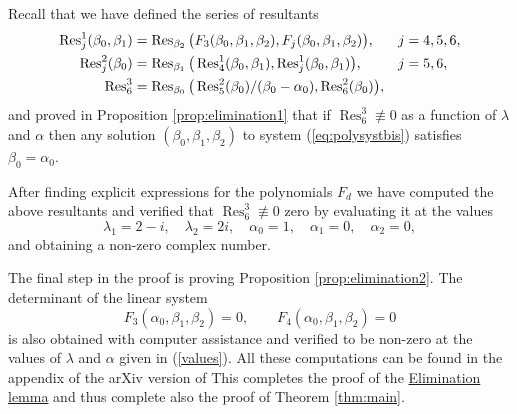 Recall that we have defined the series of resultants
\begin{align*}
 \operatorname{Res}^1_j(\beta_0,\beta_1) &= \operatorname{Res}_{\beta_2}\big(F_3(\beta_0,\beta_1,\beta_2),F_j(\beta_0,\beta_1,\beta_2)\big), & j &= 4,5,6, \\
 \operatorname{Res}^2_j(\beta_0) &= \operatorname{Res}_{\beta_1}\big(\operatorname{Res}^1_4(\beta_0,\beta_1),\operatorname{Res}^1_j(\beta_0,\beta_1)\big), & j &= 5,6, \\
 \operatorname{Res}^3_6   &= \operatorname{Res}_{\beta_0}\big(\operatorname{Res}^2_5(\beta_0)/(\beta_0-\alpha_0),\operatorname{Res}^2_6(\beta_0)\big), & &
\end{align*}
and proved in Proposition \ref{prop:elimination1} that if $\operatorname{Res}_6^3\not\equiv0$ as a function of $\lambda$ and $\alpha$ then any solution $(\beta_0,\beta_1,\beta_2)$ to system (\ref{eq:polysystbis}) satisfies $\beta_0=\alpha_0$. 

After finding explicit expressions for the polynomials $F_d$ we have computed the above resultants and verified that $\operatorname{Res}_6^3\not\equiv0$ zero by evaluating it at the values
\begin{equation}\label{values}
  \lambda_1=2-i,\quad \lambda_2=2i,\quad \alpha_0=1,\quad \alpha_1=0,\quad \alpha_2=0,
\end{equation}
and obtaining a non-zero complex number.

The final step in the proof is proving Proposition \ref{prop:elimination2}. The determinant of the linear system 
\[ F_3(\alpha_0,\beta_1,\beta_2)=0,\qquad F_4(\alpha_0,\beta_1,\beta_2)=0 \] 
is also obtained with computer assistance and verified to be non-zero at the values of $\lambda$ and $\alpha$ given in (\ref{values}). All these computations can be found in the appendix of the arXiv version of \cite{UtmostRigidity}
This completes the proof of the \hyperref[lemma:elimination]{Elimination lemma} and thus complete also the proof of Theorem \ref{thm:main}.




































